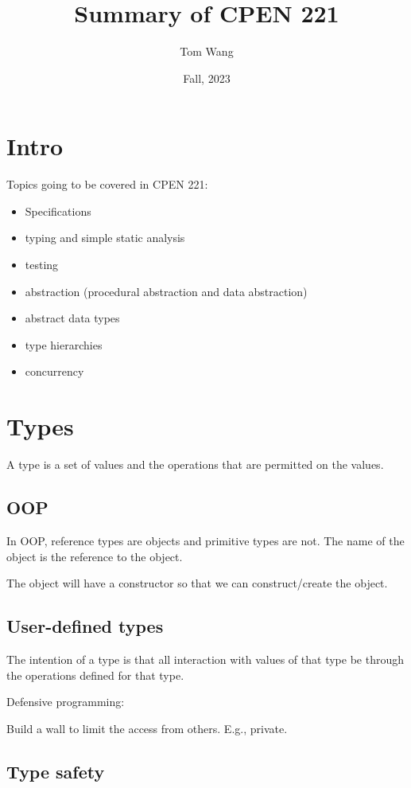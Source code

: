 \documentclass[letterpaper,12pt]{article}
\title{Summary of CPEN 221}
\author{Tom Wang}
\date{Fall, 2023}
\begin{document}
\maketitle
\thispagestyle{plain}

\section{Intro}

Topics going to be covered in CPEN 221:
\begin{itemize}
      \item Specifications
      \item typing and simple static analysis
      \item testing
      \item abstraction (procedural abstraction and data abstraction)
      \item abstract data types
      \item type hierarchies
      \item concurrency
\end{itemize}

\section{Types}

A type is a set of values and the operations that are permitted on the values.

\subsection{OOP}
In OOP, reference types are objects and primitive types
are not. The name of the object is the reference to the object.

The object will have a constructor so that we can construct/create the object.
\subsection{User-defined types}
The intention of a type is that all interaction with values of that type be
through the operations defined for that type.

Defensive programming:

Build a wall to limit the access from others. E.g., private.

\subsection{Type safety}
\end{document}
